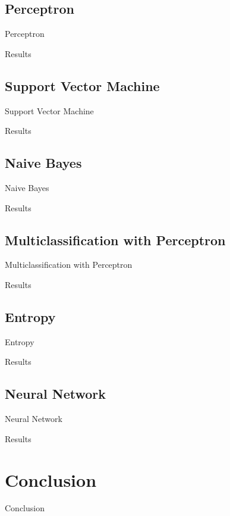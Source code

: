 \documentclass{beamer}
\begin{document}
\subsection{Perceptron}
\begin{frame}{Perceptron}
\end{frame}
\begin{frame}{Results}
\end{frame}

\subsection{Support Vector Machine}
\begin{frame}{Support Vector Machine}
\end{frame}
\begin{frame}{Results}
\end{frame}

\subsection{Naive Bayes}
\begin{frame}{Naive Bayes}
\end{frame}
\begin{frame}{Results}
\end{frame}

\subsection{Multiclassification with Perceptron}
\begin{frame}{Multiclassification with Perceptron}
\end{frame}
\begin{frame}{Results}
\end{frame}

\subsection{Entropy}
\begin{frame}{Entropy}
\end{frame}
\begin{frame}{Results}
\end{frame}

\subsection{Neural Network}
\begin{frame}{Neural Network}
\end{frame}
\begin{frame}{Results}
\end{frame}



\section{Conclusion}

\begin{frame}{Conclusion}
\end{frame}
\end{document}
